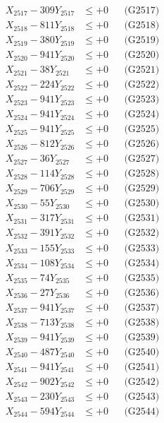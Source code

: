 \documentclass[a4paper,10pt]{article}
\begin{document}
{\begin{align}
X_{2517} - 309Y_{2517} &\leq +0 && \text{(G2517)} \\
X_{2518} - 811Y_{2518} &\leq +0 && \text{(G2518)} \\
X_{2519} - 380Y_{2519} &\leq +0 && \text{(G2519)} \\
X_{2520} - 941Y_{2520} &\leq +0 && \text{(G2520)} \\
\allowbreak
X_{2521} - 38Y_{2521} &\leq +0 && \text{(G2521)} \\
X_{2522} - 224Y_{2522} &\leq +0 && \text{(G2522)} \\
X_{2523} - 941Y_{2523} &\leq +0 && \text{(G2523)} \\
X_{2524} - 941Y_{2524} &\leq +0 && \text{(G2524)} \\
X_{2525} - 941Y_{2525} &\leq +0 && \text{(G2525)} \\
X_{2526} - 812Y_{2526} &\leq +0 && \text{(G2526)} \\
X_{2527} - 36Y_{2527} &\leq +0 && \text{(G2527)} \\
X_{2528} - 114Y_{2528} &\leq +0 && \text{(G2528)} \\
X_{2529} - 706Y_{2529} &\leq +0 && \text{(G2529)} \\
X_{2530} - 55Y_{2530} &\leq +0 && \text{(G2530)} \\
\allowbreak
X_{2531} - 317Y_{2531} &\leq +0 && \text{(G2531)} \\
X_{2532} - 391Y_{2532} &\leq +0 && \text{(G2532)} \\
X_{2533} - 155Y_{2533} &\leq +0 && \text{(G2533)} \\
X_{2534} - 108Y_{2534} &\leq +0 && \text{(G2534)} \\
X_{2535} - 74Y_{2535} &\leq +0 && \text{(G2535)} \\
X_{2536} - 27Y_{2536} &\leq +0 && \text{(G2536)} \\
X_{2537} - 941Y_{2537} &\leq +0 && \text{(G2537)} \\
X_{2538} - 713Y_{2538} &\leq +0 && \text{(G2538)} \\
X_{2539} - 941Y_{2539} &\leq +0 && \text{(G2539)} \\
X_{2540} - 487Y_{2540} &\leq +0 && \text{(G2540)} \\
\allowbreak
X_{2541} - 941Y_{2541} &\leq +0 && \text{(G2541)} \\
X_{2542} - 902Y_{2542} &\leq +0 && \text{(G2542)} \\
X_{2543} - 230Y_{2543} &\leq +0 && \text{(G2543)} \\
X_{2544} - 594Y_{2544} &\leq +0 && \text{(G2544)} \\

\end{align}}
\end{document}
